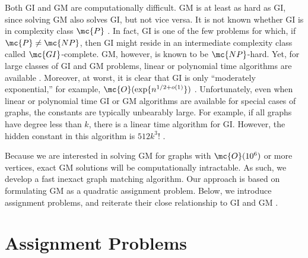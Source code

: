 \documentclass[10pt,journal,cspaper,compsoc]{IEEEtran}
\begin{document}
Both GI and GM are computationally difficult. GM is at least as hard as GI, since solving GM also solves GI, but not vice versa. It is not known whether GI is in complexity class $\mc{P}$ \cite{Fortin1996}.  In fact, GI is one of the few problems for which, if $\mc{P} \neq \mc{NP}$, then GI might reside in an intermediate complexity class called $\mc{GI}$-complete.  GM, however, is known to be $\mc{NP}$-hard.    
Yet, for large classes of GI and GM problems, linear or polynomial time algorithms are available \cite{Babai1980}.  Moreover, at worst, it is clear that GI is only ``moderately exponential,'' for example, $\mc{O}(\exp\{n^{1/2 + o(1)}\})$ \cite{Babai1981}.  Unfortunately, even when linear or polynomial time GI or GM algorithms are available for special cases of graphs, the constants are typically unbearably large.  For example, if all graphs have degree less than $k$, there is a linear time algorithm for GI.  However, the hidden constant in this algorithm is $512k^3!$ \cite{Chen1994}.  

Because we are interested in solving GM for graphs with $\mc{O}(10^6)$ or more vertices, exact GM solutions will be computationally intractable. As such, we develop a fast inexact graph matching algorithm.   Our approach is based on formulating GM as a quadratic assignment problem.  Below, we introduce assignment problems, and reiterate their close relationship to GI and GM \cite{Burkard2009}.



\section{Assignment Problems} %
\label{sub:assignment_problems}
\end{document}
